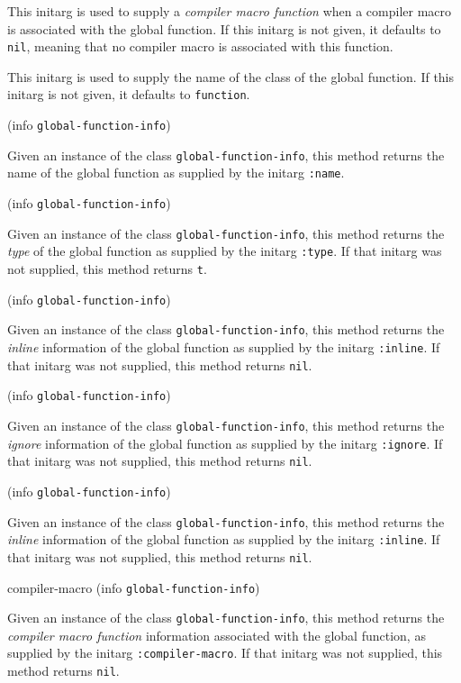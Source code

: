 
This initarg is used to supply a \emph{compiler macro function} when
a compiler macro is associated with the global function.  If this
initarg is not given, it defaults to \texttt{nil}, meaning that no
compiler macro is associated with this function. 


This initarg is used to supply the name of the class of the global
function.  If this initarg is not given, it defaults to
\texttt{function}.

 {(info {\tt global-function-info})}

Given an instance of the class \texttt{global-function-info}, this
method returns the name of the global function as supplied by the
initarg \texttt{:name}.

 {(info {\tt global-function-info})}

Given an instance of the class \texttt{global-function-info}, this
method returns the \emph{type} of the global function as supplied by the
initarg \texttt{:type}.  If that initarg was not supplied, this method
returns \texttt{t}.

 {(info {\tt global-function-info})}

Given an instance of the class \texttt{global-function-info}, this
method returns the \emph{inline} information of the global function as
supplied by the initarg \texttt{:inline}.  If that initarg was not
supplied, this method returns \texttt{nil}.

 {(info {\tt global-function-info})}

Given an instance of the class \texttt{global-function-info}, this
method returns the \emph{ignore} information of the global function as
supplied by the initarg \texttt{:ignore}.  If that initarg was not
supplied, this method returns \texttt{nil}.

 {(info {\tt global-function-info})}

Given an instance of the class \texttt{global-function-info}, this
method returns the \emph{inline} information of the global function as
supplied by the initarg \texttt{:inline}. If that initarg was not
supplied, this method returns \texttt{nil}.

\Defmethod compiler-macro {(info {\tt global-function-info})}

Given an instance of the class \texttt{global-function-info}, this
method returns the \emph{compiler macro function} information
associated with the global function, as supplied by the initarg
\texttt{:compiler-macro}.  If that initarg was not supplied, this
method returns \texttt{nil}.

